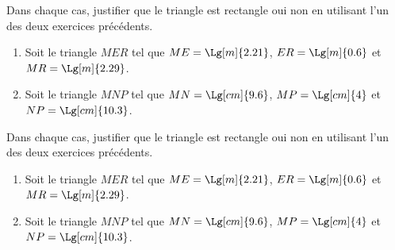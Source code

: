 \begin{exercice*}
    Dans chaque cas, justifier que le triangle est rectangle oui non en utilisant l'un des deux exercices précédents.
    \begin{enumerate}
        \item Soit le triangle $MER$ tel que $ME=\Lg[m]{2.21}$, $ER=\Lg[m]{0.6}$ et $MR=\Lg[m]{2.29}$.
        \item Soit le triangle $MNP$ tel que $MN=\Lg[cm]{9.6}$, $MP=\Lg[cm]{4}$ et $NP=\Lg[cm]{10.3}$.
    \end{enumerate}
\end{exercice*}
\begin{corrige}
    Dans chaque cas, justifier que le triangle est rectangle oui non en utilisant l'un des deux exercices précédents.

    \begin{enumerate}
        \item Soit le triangle $MER$ tel que $ME=\Lg[m]{2.21}$, $ER=\Lg[m]{0.6}$ et $MR=\Lg[m]{2.29}$.
        
        {\red {}}
        \item Soit le triangle $MNP$ tel que $MN=\Lg[cm]{9.6}$, $MP=\Lg[cm]{4}$ et $NP=\Lg[cm]{10.3}$.
    \end{enumerate}
    \Coupe        
    {\red {}}    
\end{corrige}

